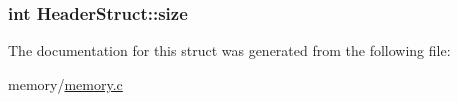 \subsubsection[{size}]{\setlength{\rightskip}{0pt plus 5cm}int Header\+Struct\+::size}\label{struct_header_struct_ad6b63ca7e387b292da71cf12e41b56ca}


The documentation for this struct was generated from the following file\+:\begin{DoxyCompactItemize}
\item 
memory/\hyperlink{memory_8c}{memory.\+c}\end{DoxyCompactItemize}

